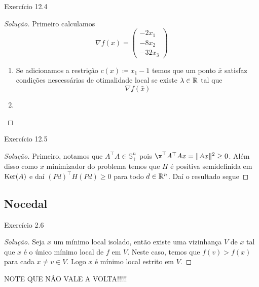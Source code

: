 \documentclass[12pt,twoside,a4paper]{article}
\begin{document}
\begin{problema}
  Exercício 12.4
\end{problema}
\begin{proof}[Solução]
Primeiro calculamos \[\nabla f(x)=\begin{pmatrix} -2x_1 \\ -8x_2 \\ -32
    x_3 \end{pmatrix}\]
\begin{enumerate}
 \item Se adicionamos a restrição \(c(x)\coloneqq x_1-1\) temos que um ponto
   \(\bar{x}\) satisfaz condições nescessárias de otimalidade local se existe
   \(\lambda\in\mathbb{R}\) tal que \[\nabla f(\bar{x})\]
  \item
 \end{enumerate}
\end{proof}
\begin{problema}
Exercício 12.5  
\end{problema}
\begin{proof}[Solução]
Primeiro, notamos que \(A^\top A\in\mathbb{S}^n_+\) pois \(\x^\top A^\top A
x=\|Ax\|^2\geq 0\). Além disso como \(x\) minimizador do problema temos que
\(H\) é positiva semidefinida em \(\operatorname{Ker}(A)\) e daí \((Pd)^\top H (Pd)\geq 0 \)
para todo \(d\in\mathbb{R}^n\). Daí o resultado segue 
\end{proof}
\subsection{Nocedal}
\begin{problema}
  Exercício 2.6
\end{problema}
\begin{proof}[Solução]
Seja \(x\) um mínimo local isolado, então existe uma vizinhança \(V\) de \(x\)
tal que \(x\) é o único mínimo local de \(f\) em \(V\). Neste caso, temos que
\(f(v)>f(x)\) para cada \(x\not = v\in V\). Logo \(x\) é mínimo local estrito em \(V\).  
\end{proof}

NOTE QUE NÂO VALE A VOLTA!!!!!
\end{document}
